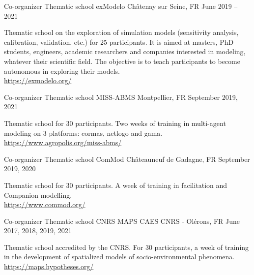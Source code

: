 \begin{cventries}
    \cventry
      {Co-organizer} %
      {Thematic school exModelo} %
      {Châtenay sur Seine, FR} %
      {June 2019 -- 2021} %
      {
        \begin{cvitems} %
          Thematic school on the exploration of simulation models (sensitivity analysis, calibration, validation, etc.) for 25 participants. It is aimed at masters, PhD students, engineers, academic researchers and companies interested in modeling, whatever their scientific field. The objective is to teach participants to become autonomous in exploring their models.\\
          \url{https://exmodelo.org/}
          \end{cvitems}
      }
    \cventry
      {Co-organizer} %
      {Thematic school MISS-ABMS} %
      {Montpellier, FR} %
      {September 2019, 2021} %
      {
      \begin{cvitems} %
        Thematic school for 30 participants. Two weeks of training in multi-agent modeling on 3 platforms: cormas, netlogo and gama.\\
        \url{https://www.agropolis.org/miss-abms/}
      \end{cvitems}
      }
    \cventry
      {Co-organizer} %
      {Thematic school ComMod} %
      {Châteauneuf de Gadagne, FR} %
      {September 2019, 2020} %
      {
      \begin{cvitems} %
        Thematic school for 30 participants. A week of training in facilitation and Companion modelling.\\
        \url{https://www.commod.org/}
      \end{cvitems}
      }
  \cventry
    {Co-organizer} %
    {Thematic school CNRS MAPS} %
    {CAES CNRS - Olérons, FR} %
    {June 2017, 2018, 2019, 2021} %
    {
      \begin{cvitems} %
        Thematic school accredited by the CNRS. For 30 participants, a week of training in the development of spatialized models of socio-environmental phenomena. \url{https://maps.hypotheses.org/}
        \end{cvitems}
    }


\end{cventries}
